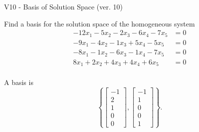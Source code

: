 \begin{exercise}
  \begin{exerciseTitle}V10 - Basis of Solution Space (ver. 10)\end{exerciseTitle}
  \begin{exerciseStatement}
    Find a basis for the solution space of the homogeneous system 
\begin{align*}
 -12 x_ 1 -5 x_ 2 -2 x_ 3 -6 x_ 4 -7 x_ 5 &= 0  \\ 
  -9 x_ 1 -4 x_ 2 -1 x_ 3 + 5 x_ 4 -5 x_ 5 &= 0  \\ 
  -8 x_ 1 -1 x_ 2 -6 x_ 3 -1 x_ 4 -7 x_ 5 &= 0  \\ 
  8 x_ 1 + 2 x_ 2 + 4 x_ 3 + 4 x_ 4 + 6 x_ 5 &= 0  \\ 
 \end{align*}


 
  \end{exerciseStatement}

  \begin{exerciseAnswer}
   A basis is   
\[\left\{\left[\begin{array}{c}
-1 \\
2 \\
1 \\
0 \\
0
\end{array}\right] , \left[\begin{array}{c}
-1 \\
1 \\
0 \\
0 \\
1
\end{array}\right]\right\}.\]

  


  \end{exerciseAnswer}
\end{exercise}